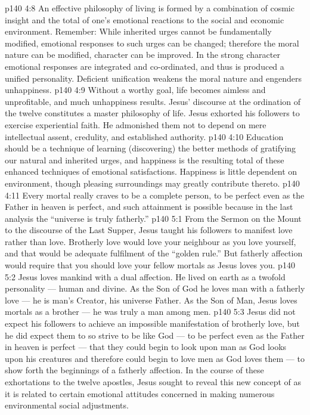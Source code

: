 \vs p140 4:8 \pc An effective philosophy of living is formed by a combination of cosmic insight and the total of one’s emotional reactions to the social and economic environment. Remember: While inherited urges cannot be fundamentally modified, emotional responses to such urges can be changed; therefore the moral nature can be modified, character can be improved. In the strong character emotional responses are integrated and co\hyp{}ordinated, and thus is produced a unified personality. Deficient unification weakens the moral nature and engenders unhappiness.
\vs p140 4:9 Without a worthy goal, life becomes aimless and unprofitable, and much unhappiness results. Jesus’ discourse at the ordination of the twelve constitutes a master philosophy of life. Jesus exhorted his followers to exercise experiential faith. He admonished them not to depend on mere intellectual assent, credulity, and established authority.
\vs p140 4:10 Education should be a technique of learning (discovering) the better methods of gratifying our natural and inherited urges, and happiness is the resulting total of these enhanced techniques of emotional satisfactions. Happiness is little dependent on environment, though pleasing surroundings may greatly contribute thereto.
\vs p140 4:11 \pc Every mortal really craves to be a complete person, to be perfect even as the Father in heaven is perfect, and such attainment is possible because in the last analysis the “universe is truly fatherly.”
\vs p140 5:1 From the Sermon on the Mount to the discourse of the Last Supper, Jesus taught his followers to manifest  love rather than  love. Brotherly love would love your neighbour as you love yourself, and that would be adequate fulfilment of the “golden rule.” But fatherly affection would require that you should love your fellow mortals as Jesus loves you.
\vs p140 5:2 Jesus loves mankind with a dual affection. He lived on earth as a twofold personality --- human and divine. As the Son of God he loves man with a fatherly love --- he is man’s Creator, his universe Father. As the Son of Man, Jesus loves mortals as a brother --- he was truly a man among men.
\vs p140 5:3 Jesus did not expect his followers to achieve an impossible manifestation of brotherly love, but he did expect them to so strive to be like God --- to be perfect even as the Father in heaven is perfect --- that they could begin to look upon man as God looks upon his creatures and therefore could begin to love men as God loves them --- to show forth the beginnings of a fatherly affection. In the course of these exhortations to the twelve apostles, Jesus sought to reveal this new concept of  as it is related to certain emotional attitudes concerned in making numerous environmental social adjustments.
